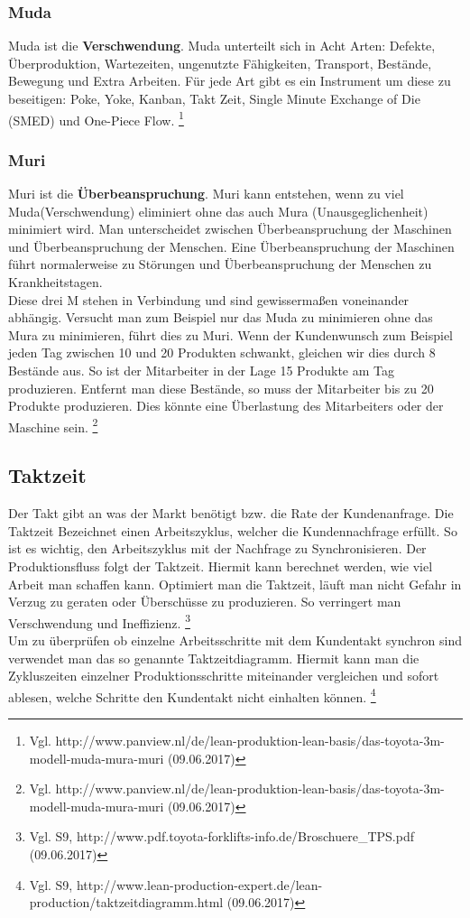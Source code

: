 \documentclass[00_ToyotaProduktionssystem.tex]{subfiles}
\begin{document}
\subsubsection{Muda}
Muda ist die \textbf{Verschwendung}. Muda unterteilt sich in Acht Arten: Defekte, Überproduktion, Wartezeiten, ungenutzte Fähigkeiten, Transport, Bestände, Bewegung und Extra Arbeiten. Für jede Art gibt es ein Instrument um diese zu beseitigen: Poke, Yoke, Kanban, Takt Zeit, Single Minute Exchange of Die (SMED) und One-Piece Flow. 
\footnote{Vgl.  http://www.panview.nl/de/lean-produktion-lean-basis/das-toyota-3m-modell-muda-mura-muri (09.06.2017)}
\subsubsection{Muri}
Muri ist die \textbf{Überbeanspruchung}. Muri kann entstehen, wenn zu viel Muda(Verschwendung) eliminiert ohne das auch Mura (Unausgeglichenheit) minimiert wird. Man unterscheidet zwischen Überbeanspruchung der Maschinen und Überbeanspruchung der Menschen. Eine Überbeanspruchung der Maschinen führt normalerweise zu Störungen und Überbeanspruchung der Menschen zu Krankheitstagen. \\ Diese drei M stehen in Verbindung und sind gewissermaßen voneinander abhängig. Versucht man zum Beispiel nur das Muda zu minimieren ohne das Mura zu minimieren, führt dies zu Muri. Wenn der Kundenwunsch zum Beispiel jeden Tag zwischen 10 und 20 Produkten schwankt, gleichen wir dies durch 8 Bestände aus. So ist der Mitarbeiter in der Lage 15 Produkte am Tag produzieren. Entfernt man diese Bestände, so muss der Mitarbeiter bis zu 20 Produkte produzieren. Dies könnte eine Überlastung des Mitarbeiters oder der Maschine sein. 
\footnote{Vgl.  http://www.panview.nl/de/lean-produktion-lean-basis/das-toyota-3m-modell-muda-mura-muri (09.06.2017)}

\subsection{Taktzeit}
Der Takt gibt an was der Markt benötigt bzw. die Rate der Kundenanfrage. Die Taktzeit Bezeichnet einen Arbeitszyklus, welcher die Kundennachfrage erfüllt. So ist es wichtig, den Arbeitszyklus mit der Nachfrage zu Synchronisieren. Der Produktionsfluss folgt der Taktzeit. Hiermit kann berechnet werden, wie viel Arbeit man schaffen kann. Optimiert man die Taktzeit, läuft man nicht Gefahr in Verzug zu geraten oder Überschüsse zu produzieren. So verringert man Verschwendung und Ineffizienz. 
\footnote{Vgl. S9,  http://www.pdf.toyota-forklifts-info.de/Broschuere\_TPS.pdf (09.06.2017)}
\\
Um zu überprüfen ob einzelne Arbeitsschritte mit dem Kundentakt synchron sind verwendet man das so genannte Taktzeitdiagramm. Hiermit kann man die Zykluszeiten einzelner Produktionsschritte miteinander vergleichen und sofort ablesen, welche Schritte den Kundentakt nicht einhalten können. 
\footnote{Vgl. S9,  http://www.lean-production-expert.de/lean-production/taktzeitdiagramm.html (09.06.2017)}
\end{document}
